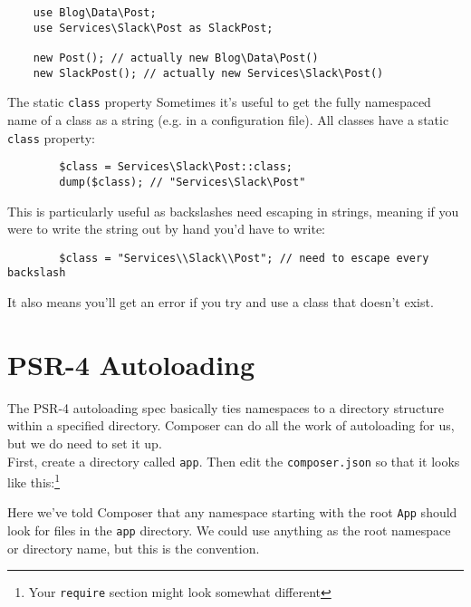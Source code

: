 \begin{verbatim}
    use Blog\Data\Post;
    use Services\Slack\Post as SlackPost;

    new Post(); // actually new Blog\Data\Post()
    new SlackPost(); // actually new Services\Slack\Post()
\end{verbatim}


\pagebreak

\begin{infobox}{The static \texttt{class} property}
    Sometimes it's useful to get the fully namespaced name of a class as a string (e.g. in a configuration file). All classes have a static \texttt{class} property:

    \begin{verbatim}
        $class = Services\Slack\Post::class;
        dump($class); // "Services\Slack\Post"
    \end{verbatim}

    This is particularly useful as backslashes need escaping in strings, meaning if you were to write the string out by hand you'd have to write:

    \begin{verbatim}
        $class = "Services\\Slack\\Post"; // need to escape every backslash
    \end{verbatim}

    It also means you'll get an error if you try and use a class that doesn't exist.
\end{infobox}




\section{PSR-4 Autoloading}

The PSR-4 autoloading spec basically ties namespaces to a directory structure within a specified directory. Composer can do all the work of autoloading for us, but we do need to set it up.
\\

First, create a directory called \texttt{app}. Then edit the \texttt{composer.json} so that it looks like this:\footnote{Your \texttt{require} section might look somewhat different}


Here we've told Composer that any namespace starting with the root \texttt{App} should look for files in the \texttt{app} directory. We could use anything as the root namespace or directory name, but this is the convention.
\\


